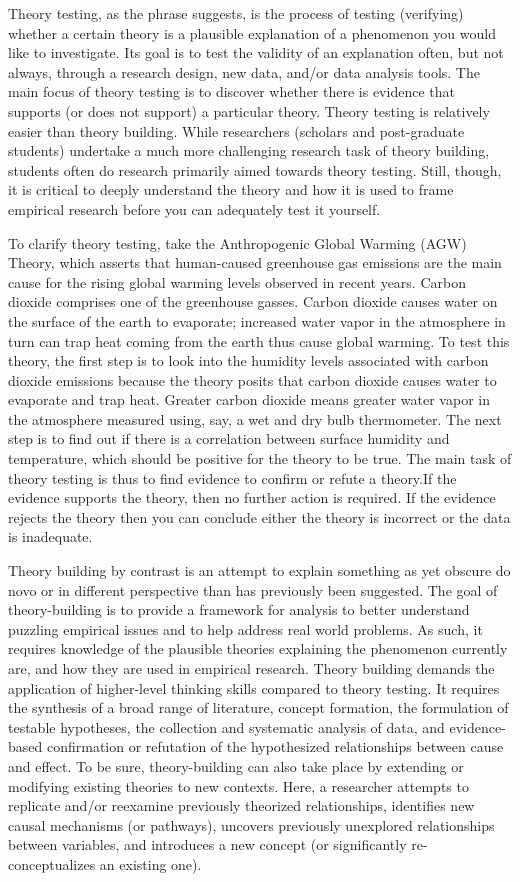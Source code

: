 \documentclass{book}
\begin{document}
Theory testing, as the phrase suggests, is the process of testing (verifying)
whether a certain theory is a plausible explanation of a phenomenon you would
like to investigate. Its goal is to test the validity of an explanation often,
but not always, through a research design, new data, and/or data analysis
tools. The main focus of theory testing is to discover whether there is
evidence that supports (or does not support) a particular theory. Theory
testing is relatively easier than theory building. While researchers (scholars
and post-graduate students) undertake a much more challenging research task of
theory building, students often do research primarily aimed towards theory
testing. Still, though, it is critical to deeply understand the theory and how
it is used to frame empirical research before you can adequately test it
yourself.

To clarify theory testing, take the Anthropogenic Global Warming (AGW) Theory,
which asserts that human-caused greenhouse gas emissions are the main cause
for the rising global warming levels observed in recent years. Carbon dioxide
comprises one of the greenhouse gasses. Carbon dioxide causes water on the
surface of the earth to evaporate; increased water vapor in the atmosphere in
turn can trap heat coming from the earth thus cause global warming. To test
this theory, the first step is to look into the humidity levels associated
with carbon dioxide emissions because the theory posits that carbon dioxide
causes water to evaporate and trap heat. Greater carbon dioxide means greater
water vapor in the atmosphere measured using, say, a wet and dry bulb
thermometer. The next step is to find out if there is a correlation between
surface humidity and temperature, which should be positive for the theory to
be true. The main task of theory testing is thus to find evidence to confirm
or refute a theory.If the evidence supports the theory, then no further action
is required. If the evidence rejects the theory then you can conclude either
the theory is incorrect or the data is inadequate.

Theory building by contrast is an attempt to explain something as yet obscure
do novo or in different perspective than has previously been suggested. The
goal of theory-building is to provide a framework for analysis to better
understand puzzling empirical issues and to help address real world problems.
As such, it requires knowledge of the plausible theories explaining the
phenomenon currently are, and how they are used in empirical research. Theory
building demands the application of higher-level thinking skills compared to
theory testing. It requires the synthesis of a broad range of literature,
concept formation, the formulation of testable hypotheses, the collection and
systematic analysis of data, and evidence-based confirmation or refutation of
the hypothesized relationships between cause and effect. To be sure,
theory-building can also take place by extending or modifying existing
theories to new contexts. Here, a researcher attempts to replicate and/or
reexamine previously theorized relationships, identifies new causal mechanisms
(or pathways), uncovers previously unexplored relationships between variables,
and introduces a new concept (or significantly re-conceptualizes an existing
one).
\end{document}
